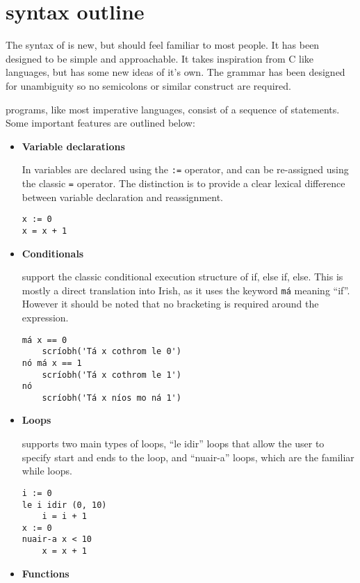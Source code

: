 \chapter{\Setanta{} syntax outline}
The syntax of \Setanta{} is new, but should feel familiar to most people. It has been designed to be simple and approachable. It takes inspiration from C like languages, but has some new ideas of it's own.
The grammar has been designed for unambiguity so no semicolons or similar construct are required.

\Setanta{} programs, like most imperative languages, consist of a sequence of statements. Some important \Setanta{} features are outlined below:
\begin{itemize}
    \item \textbf{Variable declarations}

        In \Setanta{} variables are declared using the \verb|:=| operator, and can be re-assigned using the classic \verb|=| operator. The distinction is to provide a clear lexical difference between variable declaration and reassignment.

            \begin{lstlisting}[language=setanta, frame=single, caption=Variables]
x := 0
x = x + 1
            \end{lstlisting}
    \item \textbf{Conditionals}

        \Setanta{} support the classic conditional execution structure of if, else if, else. This is mostly a direct translation into Irish, as it uses the keyword \lstinline[language=setanta]|má| meaning ``if''. However it should be noted that no bracketing is required around the expression.

            \begin{lstlisting}[language=setanta, frame=single, caption=Setanta conditionals]
má x == 0
    scríobh('Tá x cothrom le 0')
nó má x == 1
    scríobh('Tá x cothrom le 1')
nó
    scríobh('Tá x níos mo ná 1')
            \end{lstlisting}
        \item \textbf{Loops}

            \Setanta{} supports two main types of loops, ``le idir'' loops that allow the user to specify start and ends to the loop, and ``nuair-a'' loops, which are the familiar while loops.

            \begin{lstlisting}[language=setanta, frame=single, caption=Setanta loops]
i := 0
le i idir (0, 10)
    i = i + 1
x := 0
nuair-a x < 10
    x = x + 1
            \end{lstlisting}
        \item \textbf{Functions}


\end{itemize}
